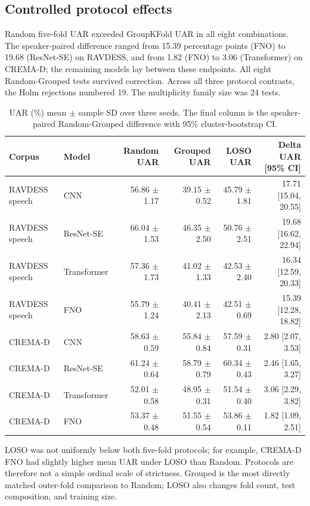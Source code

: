 \documentclass{article}
\begin{document}
\subsection{Controlled protocol effects}

Random five-fold UAR exceeded GroupKFold UAR in all eight combinations.
The speaker-paired difference ranged from 15.39 percentage points (FNO) to 19.68 (ResNet-SE) on RAVDESS, and from 1.82 (FNO) to 3.06 (Transformer) on CREMA-D; the remaining models lay between these endpoints.
All eight Random-Grouped tests survived correction.
Across all three protocol contrasts, the Holm rejections numbered 19.
The multiplicity family size was 24 tests.

\begin{table}[t]
\centering\scriptsize
\caption{UAR (\%) mean $\pm$ sample SD over three seeds. The final column is the speaker-paired Random-Grouped difference with 95\% cluster-bootstrap CI.}
\begin{tabular}{llrrrr}
\toprule
Corpus & Model & Random UAR & Grouped UAR & LOSO UAR & Delta UAR [95\% CI] \\ 
\midrule
RAVDESS speech & CNN & 56.86 $\pm$ 1.17 & 39.15 $\pm$ 0.52 & 45.79 $\pm$ 1.81 & 17.71 [15.04, 20.55] \\
RAVDESS speech & ResNet-SE & 66.04 $\pm$ 1.53 & 46.35 $\pm$ 2.50 & 50.76 $\pm$ 2.51 & 19.68 [16.62, 22.94] \\
RAVDESS speech & Transformer & 57.36 $\pm$ 1.73 & 41.02 $\pm$ 1.33 & 42.53 $\pm$ 2.40 & 16.34 [12.59, 20.33] \\
RAVDESS speech & FNO & 55.79 $\pm$ 1.24 & 40.41 $\pm$ 2.13 & 42.51 $\pm$ 0.69 & 15.39 [12.28, 18.82] \\
CREMA-D & CNN & 58.63 $\pm$ 0.59 & 55.84 $\pm$ 0.84 & 57.59 $\pm$ 0.31 & 2.80 [2.07, 3.53] \\
CREMA-D & ResNet-SE & 61.24 $\pm$ 0.64 & 58.79 $\pm$ 0.79 & 60.34 $\pm$ 0.43 & 2.46 [1.65, 3.27] \\
CREMA-D & Transformer & 52.01 $\pm$ 0.58 & 48.95 $\pm$ 0.31 & 51.54 $\pm$ 0.40 & 3.06 [2.29, 3.82] \\
CREMA-D & FNO & 53.37 $\pm$ 0.48 & 51.55 $\pm$ 0.54 & 53.86 $\pm$ 0.11 & 1.82 [1.09, 2.51] \\
\bottomrule
\end{tabular}
\end{table}

LOSO was not uniformly below both five-fold protocols; for example, CREMA-D FNO had slightly higher mean UAR under LOSO than Random.
Protocols are therefore not a simple ordinal scale of strictness.
Grouped is the most directly matched outer-fold comparison to Random; LOSO also changes fold count, test composition, and training size.
\end{document}
